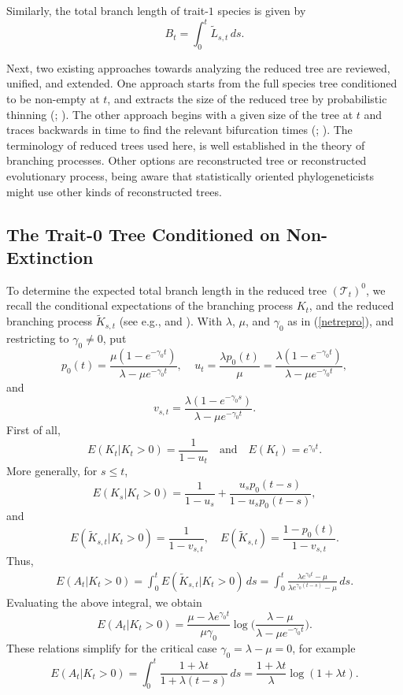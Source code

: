\documentclass[a4paper,11pt]{article}
\theoremstyle{plain}
\theoremstyle{definition}
\numberwithin{equation}{section}
\begin{document}
\noindent Similarly, 
the total branch length of trait-$1$ species is given by
\begin{equation}\label{totalbranchself}
B_t=\int_0^t \widetilde L_{s,t}\,ds.
\end{equation}

Next, two existing approaches towards analyzing the reduced tree are
reviewed, unified, and extended.  One approach starts from the full
species tree conditioned to be non-empty at $t$, and extracts the size
of the reduced tree by probabilistic thinning (\cite{kendall}; \cite{nee_etal}). 
The other approach begins with a given size of the tree at $t$
and traces backwards in time to find the relevant bifurcation times
(\cite{thompson}; \cite{gernhard}).  The terminology of reduced trees used here,
is well established in the theory of branching processes.  Other
options are reconstructed tree or reconstructed evolutionary process,
being aware that statistically oriented phylogeneticists might use other
kinds of reconstructed trees.


\subsection*{The Trait-0 Tree Conditioned on Non-Extinction}

To determine the expected total branch length in the reduced tree
$(\mathcal T_t)^\mathrm{0}$, we recall the conditional expectations
of the branching process $K_t$, and the reduced branching process
$\widetilde K_{s,t}$ (see e.g., \cite{kendall} and \cite{nee_etal}).  With
$\lambda$, $\mu$, and $\gamma_0$ as in (\ref{netrepro}), and
restricting to $\gamma_0\not=0$, put
\[
p_0(t)=\frac{\mu(1-e^{-\gamma_0 t})}{\lambda-\mu e^{-\gamma_0t}}, \;\;\;\;
u_t=\frac{\lambda p_0(t)}{\mu}=\frac{\lambda(1-e^{-\gamma_0
    t})}{\lambda-\mu e^{-\gamma_0 t}},
\]
and
\[
v_{s,t}=\frac{\lambda(1-e^{-\gamma_0 s})}{\lambda-\mu e^{-\gamma_0 t}}.
\]
First of all,
\[
E(K_t|K_t>0)=\frac{1}{1-u_t} \quad \mbox{and} \quad E(K_t)=e^{\gamma_0 t}.
\]
More generally, for $s\le t$,
\begin{equation}\label{expectedK_s}
E(K_s|K_t>0)=\frac{1}{1-u_s}+\frac{u_sp_0(t-s)}{1-u_sp_0(t-s)},
\end{equation}
and
\begin{equation}\label{condmeanreduced}
E(\widetilde K_{s,t}|K_t>0)=\frac{1}{1-v_{s,t}}, \quad
E(\widetilde K_{s,t})=\frac{1-p_0(t)}{1-v_{s,t}}.
\end{equation}
Thus, 
\begin{align}
\label{dndsweightout}
E(A_t|K_t>0)=\int_0^t E(\widetilde K_{s,t}|K_t>0)\,ds
=\int_0^t \frac{\lambda e^{\gamma_0 t}-\mu}{\lambda e^{\gamma_0(t-s)}-\mu}\,ds.  
\end{align}
Evaluating the above integral, we obtain
\begin{equation}\nonumber
E(A_t|K_t>0)=\frac{\mu-\lambda e^{\gamma_0 t}}{\mu \gamma_0}
\log\Big(\frac{\lambda-\mu}{\lambda-\mu e^{-\gamma_0 t}}\Big).
\end{equation}
These relations simplify for the critical case
$\gamma_0=\lambda-\mu=0$, for example
 \[
E(A_t|K_t>0)
=\int_0^t \frac{1+\lambda t}{1+\lambda(t-s)}\,ds=\frac{1+\lambda
t}{\lambda}\log(1+\lambda t).
\]  
\end{document}
